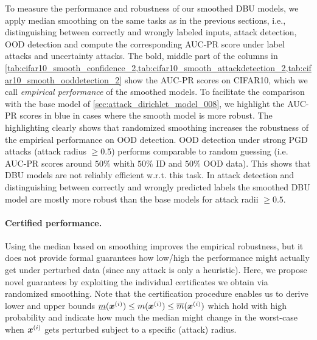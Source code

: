 To measure the performance and robustness of our smoothed DBU models, we apply median smoothing on the same tasks as in the previous sections, i.e., distinguishing between correctly and wrongly labeled inputs, attack detection, OOD detection and compute the corresponding AUC-PR score under label attacks and uncertainty attacks. 
The bold, middle part of the columns in \cref{tab:cifar10_smooth_confidence_2,tab:cifar10_smooth_attackdetection_2,tab:cifar10_smooth_ooddetection_2} show the AUC-PR scores on CIFAR10, which we call \emph{empirical performance} of the smoothed models. To facilitate the comparison with the base model of \cref{sec:attack_dirichlet_model_008}, we highlight the AUC-PR scores in blue in cases where the smooth model is more robust. The highlighting clearly shows that randomized smoothing increases the robustness of the empirical performance on OOD detection. 
OOD detection under strong PGD attacks (attack radius $\geq 0.5$) performs comparable to random guessing (i.e. AUC-PR scores around $50\%$ whith $50\%$ ID and $50\%$ OOD data). This shows that DBU models are not reliably efficient w.r.t. this task.
In attack detection and distinguishing between correctly and wrongly predicted labels the smoothed DBU model are mostly more robust than the base models for attack radii $\geq 0.5$.

\paragraph{Certified performance.} Using the median based on smoothing improves the empirical robustness, but it does not provide formal guarantees how low/high the performance might actually get under perturbed data (since any attack is only a heuristic). 
Here, we propose novel guarantees by exploiting the individual certificates we obtain via randomized smoothing.
 Note that the certification procedure \citep{median_smoothing} enables us to derive lower and upper bounds $\underline{m}({\bm{x}}^{(i)}) \leq m({\bm{x}}^{(i)}) \leq \overline{m}({\bm{x}}^{(i)})$ which hold with high probability and indicate how much the median might change in the worst-case when ${\bm{x}}^{(i)}$ gets perturbed subject to a specific (attack) radius.
 
